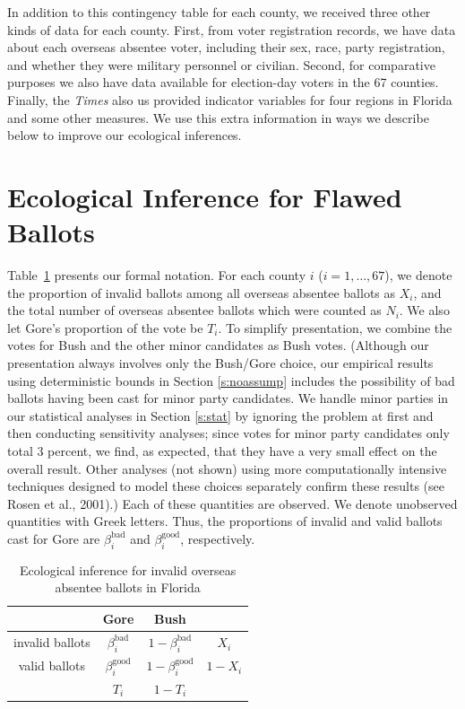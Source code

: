 \documentclass[11pt,titlepage]{article}
\newcommand{\bb}{\beta^{\text{bad}}}
\newcommand{\bg}{\beta^{\text{good}}}
\begin{document}
In addition to this contingency table for each county, we received
three other kinds of data for each county.  First, from voter
registration records, we have data about each overseas absentee voter,
including their sex, race, party registration, and whether they were
military personnel or civilian.  Second, for comparative purposes we
also have data available for election-day voters in the 67 counties.
Finally, the \emph{Times} also us provided indicator variables for
four regions in Florida and some other measures.  We use this extra
information in ways we describe below to improve our ecological
inferences.

\section{Ecological Inference for Flawed Ballots} \label{s:ecinf}

Table~\ref{tb:ei} presents our formal notation.  For each county $i$
($i=1,\dots,67$), we denote the proportion of invalid ballots among
all overseas absentee ballots as $X_i$, and the total number of
overseas absentee ballots which were counted as $N_i$.  We also let
Gore's proportion of the vote be $T_i$.  To simplify presentation, we
combine the votes for Bush and the other minor candidates as Bush
votes. (Although our presentation always involves only the Bush/Gore
choice, our empirical results using deterministic bounds in Section
\ref{s:noassump} includes the possibility of bad ballots having been
cast for minor party candidates.  We handle minor parties in our
statistical analyses in Section \ref{s:stat} by ignoring the problem
at first and then conducting sensitivity analyses; since votes for
minor party candidates only total 3 percent, we find, as expected,
that they have a very small effect on the overall result.  Other
analyses (not shown) using more computationally intensive techniques
designed to model these choices separately confirm these results (see
Rosen et al., 2001)\nocite{RosJaiKin01}.)  Each of these quantities
are observed.  We denote unobserved quantities with Greek letters.
Thus, the proportions of invalid and valid ballots cast for Gore are
$\bb_i$ and $\bg_i$, respectively.
\begin{table}[t]
\begin{center}
\begin{tabular}{cccc}
                & Gore  & Bush &         \\
\hline 
invalid ballots & $\bb_i$  & $1-\bb_i$ & $X_i$   \\
valid ballots   & $\bg_i$  & $1-\bg_i$ & $1-X_i$ \\
\hline
                & $T_i$ & $1-T_i$ &         \\
\end{tabular} \caption{Ecological inference for invalid overseas
  absentee ballots in Florida}\label{tb:ei}
\end{center}
\end{table} 
\end{document}
